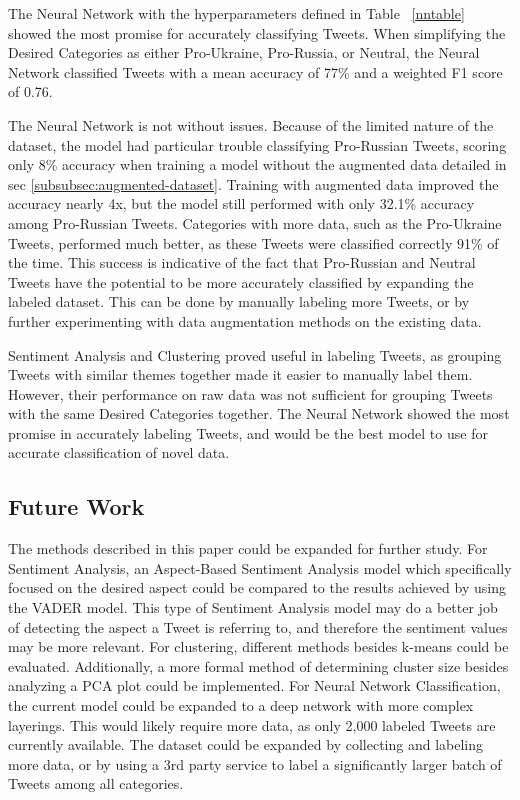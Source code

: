 \documentclass[12pt,letterpaper,oneside,titlepage]{article}
\begin{document}
The Neural Network with the hyperparameters defined in Table ~\ref{nntable} showed the most promise for accurately classifying Tweets.
When simplifying the Desired Categories
as either Pro-Ukraine, Pro-Russia, or Neutral, the Neural Network classified Tweets with a mean accuracy of 77\% and a 
weighted F1 score of 0.76. 

The Neural Network is not without issues. Because of the limited nature of the dataset, the model had particular 
trouble classifying Pro-Russian Tweets, scoring only 8\% accuracy when training a model without the augmented 
data detailed in sec \ref{subsubsec:augmented-dataset}. Training with augmented data improved the accuracy 
nearly 4x, but the model still performed with only 32.1\% accuracy among Pro-Russian Tweets. Categories with more 
data, such as the Pro-Ukraine Tweets, performed much better, as these Tweets were classified correctly 91\% of the time. 
This success is indicative of the fact that Pro-Russian and Neutral Tweets have the potential to be more accurately classified 
by expanding the labeled dataset. This can be done by manually labeling more Tweets, or by further experimenting with data augmentation methods on the existing data.

Sentiment Analysis and Clustering proved useful in labeling Tweets, as grouping Tweets with similar themes together 
made it easier to manually label them. However, their performance on raw data was not sufficient for grouping 
Tweets with the same Desired Categories together. The Neural Network showed the most promise in accurately 
labeling Tweets, and would be the best model to use for accurate classification of novel data.

\subsection{Future Work}\label{subsec:future-work}

The methods described in this paper could be expanded for further study. For Sentiment Analysis, an Aspect-Based 
Sentiment Analysis model which specifically focused on the desired aspect could be compared to the results achieved 
by using the VADER model\cite{aspect}. This type of Sentiment Analysis model may do a better job of detecting 
the aspect a Tweet is referring to, and therefore the sentiment values may be more relevant. 
For clustering, different methods besides k-means could be evaluated. Additionally, a more formal method of 
determining cluster size besides analyzing a PCA plot could be implemented. 
For Neural Network Classification, the current model could be expanded to a deep network with more 
complex layerings. This would likely require more data, as only 2,000 labeled Tweets 
are currently available. The dataset could be expanded by collecting and labeling more data, or by using a 3rd party 
service to label a significantly larger batch of Tweets among all categories.
\end{document}
